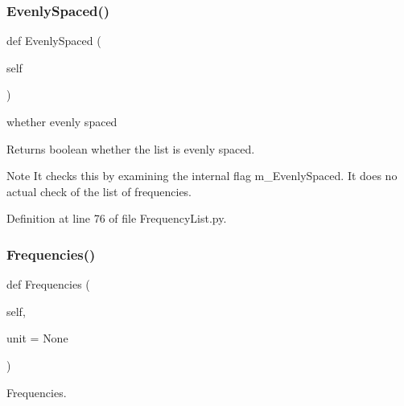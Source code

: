 \subsubsection{\texorpdfstring{Evenly\+Spaced()}{EvenlySpaced()}}
{\footnotesize\ttfamily def Evenly\+Spaced (\begin{DoxyParamCaption}\item[{}]{self }\end{DoxyParamCaption})}



whether evenly spaced 

\begin{DoxyReturn}{Returns}
boolean whether the list is evenly spaced. 
\end{DoxyReturn}
\begin{DoxyNote}{Note}
It checks this by examining the internal flag m\+\_\+\+Evenly\+Spaced. It does no actual check of the list of frequencies. 
\end{DoxyNote}


Definition at line 76 of file Frequency\+List.\+py.

\mbox{\label{classSignalIntegrity_1_1FrequencyDomain_1_1FrequencyList_1_1FrequencyList_a227f355ed05bff8c1061e26a8a53758a}} 
\subsubsection{\texorpdfstring{Frequencies()}{Frequencies()}}
{\footnotesize\ttfamily def Frequencies (\begin{DoxyParamCaption}\item[{}]{self,  }\item[{}]{unit = {\ttfamily None} }\end{DoxyParamCaption})}



Frequencies. 


